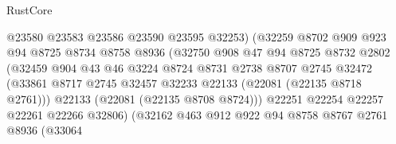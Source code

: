 \begin{lexlean}{RustCore}
\begin{coremodule}
                                    @23580
                                    @23583
                                    @23586
                                    @23590
                                    @23595
                                    @32253)
                                  (@32259
                                    @8702
                                    @909
                                    @923
                                    @94
                                    @8725
                                    @8734
                                    @8758
                                    @8936
                                    (@32750
                                      @908
                                      @47
                                      @94
                                      @8725
                                      @8732
                                      @2802
                                      (@32459
                                        @904
                                        @43
                                        @46
                                        @3224
                                        @8724
                                        @8731
                                        @2738
                                        @8707
                                        @2745
                                        @32472
                                        (@33861
                                          @8717
                                          @2745
                                          @32457
                                          @32233
                                          @22133
                                          (@22081 (@22135 @8718 @2761)))
                                        @22133
                                        (@22081 (@22135 @8708 @8724)))
                                      @22251
                                      @22254
                                      @22257
                                      @22261
                                      @22266
                                      @32806)
                                    (@32162
                                      @463
                                      @912
                                      @922
                                      @94
                                      @8758
                                      @8767
                                      @2761
                                      @8936
                                      (@33064

\end{coremodule}
\end{lexlean}
